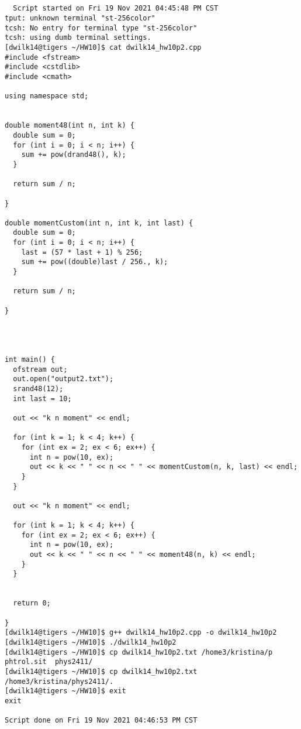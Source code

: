 \documentclass{article}
\begin{document}
\subsection{}
\begin{verbatim}
  Script started on Fri 19 Nov 2021 04:45:48 PM CST
tput: unknown terminal "st-256color"
tcsh: No entry for terminal type "st-256color"
tcsh: using dumb terminal settings.
[dwilk14@tigers ~/HW10]$ cat dwilk14_hw10p2.cpp
#include <fstream>
#include <cstdlib>
#include <cmath>

using namespace std;


double moment48(int n, int k) {
  double sum = 0;
  for (int i = 0; i < n; i++) {
    sum += pow(drand48(), k);
  }

  return sum / n;

}

double momentCustom(int n, int k, int last) {
  double sum = 0;
  for (int i = 0; i < n; i++) {
    last = (57 * last + 1) % 256;
    sum += pow((double)last / 256., k);
  }

  return sum / n;

}




int main() {
  ofstream out;
  out.open("output2.txt");
  srand48(12);
  int last = 10;

  out << "k n moment" << endl;

  for (int k = 1; k < 4; k++) {
    for (int ex = 2; ex < 6; ex++) {
      int n = pow(10, ex);
      out << k << " " << n << " " << momentCustom(n, k, last) << endl;
    }
  }

  out << "k n moment" << endl;

  for (int k = 1; k < 4; k++) {
    for (int ex = 2; ex < 6; ex++) {
      int n = pow(10, ex);
      out << k << " " << n << " " << moment48(n, k) << endl;
    }
  }


  return 0;

}
[dwilk14@tigers ~/HW10]$ g++ dwilk14_hw10p2.cpp -o dwilk14_hw10p2
[dwilk14@tigers ~/HW10]$ ./dwilk14_hw10p2
[dwilk14@tigers ~/HW10]$ cp dwilk14_hw10p2.txt /home3/kristina/p
phtrol.sit  phys2411/
[dwilk14@tigers ~/HW10]$ cp dwilk14_hw10p2.txt /home3/kristina/phys2411/.
[dwilk14@tigers ~/HW10]$ exit
exit

Script done on Fri 19 Nov 2021 04:46:53 PM CST
\end{verbatim}
\end{document}
